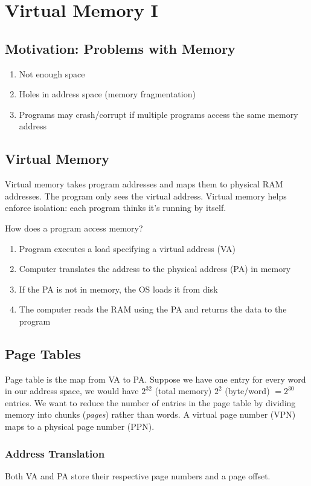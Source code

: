 \chapter{Virtual Memory I}

\section{Motivation: Problems with Memory}
\begin{enumerate}
    \item Not enough space
    \item Holes in address space (memory fragmentation)
    \item Programs may crash/corrupt if multiple programs access the same memory address
\end{enumerate}

\section{Virtual Memory}
Virtual memory takes program addresses and maps them to physical RAM addresses. The program only sees the virtual address. Virtual memory helps enforce isolation: each program thinks it's running by itself.

\medskip

How does a program access memory?
\begin{enumerate}
    \item Program executes a load specifying a virtual address (VA)
    \item Computer translates the address to the physical address (PA) in memory
    \item If the PA is not in memory, the OS loads it from disk
    \item The computer reads the RAM using the PA and returns the data to the program
\end{enumerate}

\section{Page Tables}
Page table is the map from VA to PA. Suppose we have one entry for every word in our address space, we would have $2^{32}$ (total memory) $2^2$ (byte/word) $= 2^{30}$ entries. We want to reduce the number of entries in the page table by dividing memory into chunks (\emph{pages}) rather than words. A virtual page number (VPN) maps to a physical page number (PPN).

\subsection{Address Translation}
Both VA and PA store their respective page numbers and a page offset.

